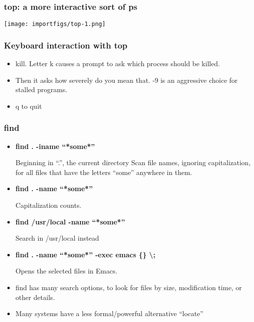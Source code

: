 \documentclass[English]{beamer}
\begin{document}
\begin{frame}[allowframebreaks]
\frametitle{\textbf{top}: a more interactive sort of ps }
\texttt{[image: importfigs/top-1.png]}

\end{frame}

\begin{frame}
\frametitle{Keyboard interaction with top}
\begin{itemize}

\item kill. Letter k causes a prompt to ask which process should be
  killed.

\item Then it asks how severely do you mean that. -9 is an aggressive
  choice for stalled programs.

\item q to quit
\end{itemize}
\end{frame}


\begin{frame}
  \frametitle{find}
  \begin{itemize}
    \item \textbf{find . -iname ``*some*''}

    Beginning in ``.'', the current directory
    Scan file names, ignoring capitalization, for all files that have
    the letters ``some'' anywhere in them. 

   \item \textbf{find . -name ``*some*''}

     Capitalization counts.

   \item \textbf{find /usr/local -name ``*some*''}

     Search in /usr/local instead
     
   \item \textbf{find . -name ``*some*'' -exec emacs \{\} \textbackslash; }

     Opens the selected files in Emacs.

   \item find has many search options, to look for files by size,
     modification time, or other details.
   \item Many systems have a less formal/powerful alternative ``locate''
   \end{itemize}
 \end{frame}
\end{document}
